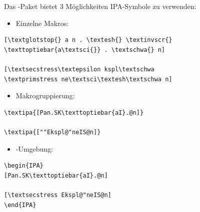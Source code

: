\begin{frame}[fragile]

Das -Paket bietet 3 Möglichkeiten IPA-Symbole zu verwenden:

\begin{itemize}
	\item Einzelne Makros:
\end{itemize}

\begin{lstlisting}
[\textglotstop{} a n . \textesh{} \textinvscr{} 
\texttoptiebar{a\textsci{}} . \textschwa{} n]

[\textsecstress\textepsilon kspl\textschwa	
\textprimstress ne\textsci\textesh\textschwa n]
\end{lstlisting}


\z 

\end{frame}

	
\begin{frame}[fragile]

\begin{itemize}	
	\item Makrogruppierung:
\end{itemize}
	
\begin{lstlisting}
\textipa{[Pan.SK\texttoptiebar{aI}.@n]}

\textipa{[""Ekspl@"neIS@n]}
\end{lstlisting}
	
\ea {}

\ex {}	
\z 	

\end{frame}


\begin{frame}[fragile]

\begin{itemize}
	\item {}-Umgebung:
\end{itemize}
	
\begin{lstlisting}
\begin{IPA}
[Pan.SK\texttoptiebar{aI}.@n]

[\textsecstress Ekspl@"neIS@n]
\end{IPA}
\end{lstlisting}
	
\ea	\begin{IPA}
	\end{IPA}

\ex \begin{IPA} 
	\end{IPA}
\z

\end{frame}


